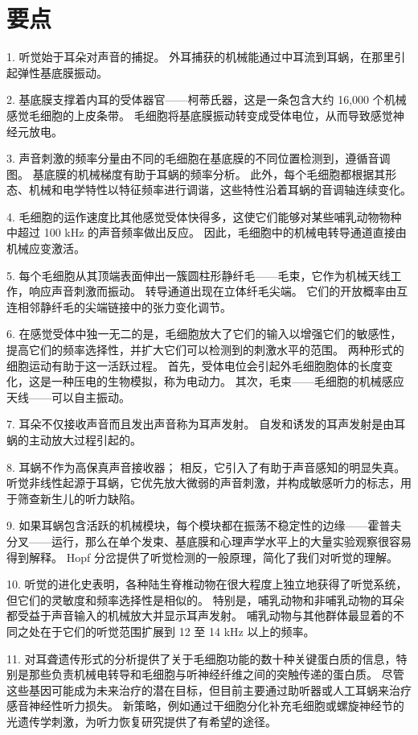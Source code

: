\section{要点}
1. 听觉始于耳朵对声音的捕捉。 外耳捕获的机械能通过中耳流到耳蜗，在那里引起弹性基底膜振动。 

2. 基底膜支撑着内耳的受体器官——柯蒂氏器，这是一条包含大约 16,000 个机械感觉毛细胞的上皮条带。 毛细胞将基底膜振动转变成受体电位，从而导致感觉神经元放电。 

3. 声音刺激的频率分量由不同的毛细胞在基底膜的不同位置检测到，遵循音调图。 基底膜的机械梯度有助于耳蜗的频率分析。 此外，每个毛细胞都根据其形态、机械和电学特性以特征频率进行调谐，这些特性沿着耳蜗的音调轴连续变化。 

4. 毛细胞的运作速度比其他感觉受体快得多，这使它们能够对某些哺乳动物物种中超过 100 kHz 的声音频率做出反应。 因此，毛细胞中的机械电转导通道直接由机械应变激活。 

5. 每个毛细胞从其顶端表面伸出一簇圆柱形静纤毛——毛束，它作为机械天线工作，响应声音刺激而振动。 转导通道出现在立体纤毛尖端。 它们的开放概率由互连相邻静纤毛的尖端链接中的张力变化调节。 

6. 在感觉受体中独一无二的是，毛细胞放大了它们的输入以增强它们的敏感性，提高它们的频率选择性，并扩大它们可以检测到的刺激水平的范围。 两种形式的细胞运动有助于这一活跃过程。 首先，受体电位会引起外毛细胞胞体的长度变化，这是一种压电的生物模拟，称为电动力。 其次，毛束——毛细胞的机械感应天线——可以自主振动。 

7. 耳朵不仅接收声音而且发出声音称为耳声发射。 自发和诱发的耳声发射是由耳蜗的主动放大过程引起的。 

8. 耳蜗不作为高保真声音接收器； 相反，它引入了有助于声音感知的明显失真。 听觉非线性起源于耳蜗，它优先放大微弱的声音刺激，并构成敏感听力的标志，用于筛查新生儿的听力缺陷。 

9. 如果耳蜗包含活跃的机械模块，每个模块都在振荡不稳定性的边缘——霍普夫分叉——运行，那么在单个发束、基底膜和心理声学水平上的大量实验观察很容易得到解释。 Hopf 分岔提供了听觉检测的一般原理，简化了我们对听觉的理解。 

10. 听觉的进化史表明，各种陆生脊椎动物在很大程度上独立地获得了听觉系统，但它们的灵敏度和频率选择性是相似的。 特别是，哺乳动物和非哺乳动物的耳朵都受益于声音输入的机械放大并显示耳声发射。 哺乳动物与其他群体最显着的不同之处在于它们的听觉范围扩展到 12 至 14 kHz 以上的频率。 

11. 对耳聋遗传形式的分析提供了关于毛细胞功能的数十种关键蛋白质的信息，特别是那些负责机械电转导和毛细胞与听神经纤维之间的突触传递的蛋白质。 尽管这些基因可能成为未来治疗的潜在目标，但目前主要通过助听器或人工耳蜗来治疗感音神经性听力损失。 新策略，例如通过干细胞分化补充毛细胞或螺旋神经节的光遗传学刺激，为听力恢复研究提供了有希望的途径。

